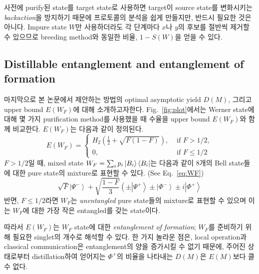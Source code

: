 \documentclass[
]{kaohandt}
\begin{document}
사전에 purify된 state를 target state로 사용하면 target이 source state를 변화시키는 \textit{backaction}을 방지하기 때문에 프로토콜의 분석을 쉽게 만들지만, 반드시 필요한 것은 아니다. 
Impure state $W$만 사용하더라도 각 단계마다 $x$나 $y$의 후보를 절반씩 제거할 수 있으므로 breeding method와 동일한 비율, $1 - S(W)$을 얻을 수 있다.

\subsection{Distillable entanglement and entanglement of formation}
마지막으로 본 논문에서 제안하는 방법의 optimal asymptotic yield $D(M)$, 그리고 upper bound $E(W_F)$에 대해 소개하고자한다.
Fig.~\ref{fig:plot}에서는 Werner state에 대해 몇 가지 purification method를 사용했을 때 수율을 upper bound $E(W_F)$와 함께 비교한다. $E(W_F)$는 다음과 같이 정의된다.
\begin{equation}
    E\left(W_F\right)= \begin{cases}H_2\left(\frac{1}{2}+\sqrt{F(1-F)}\right), & \text { if } F>1 / 2, \\ 0, & \text { if } F \leq 1 / 2\end{cases}
\end{equation}
$F > 1/2$일 때, mixed state $W_F = \sum_i p_i \ket{B_i}\bra{B_i}$는 다음과 같이 8개의 Bell state들에 대한 pure state의 mixture로 표현할 수 있다. (See Eq.~\eqref{eq:WF})
\begin{equation}
    \sqrt{F}\left|\Psi^{-}\right\rangle+\sqrt{\frac{1-F}{3}}\left( \pm\left|\Psi^{+}\right\rangle \pm\left|\Phi^{-}\right\rangle \pm i\left|\Phi^{+}\right\rangle\right.
\end{equation}
반면, $F \le 1/2$라면 $W_F$는 \textit{unentangled} pure state들의 mixture로 표현할 수 있으며 이는 $W_F$에 대한 가장 작은 entangled를 갖는 state이다. 

따라서 $E(W_F)$는 $W_F$ state에 대한 \textit{entanglement of formation}; $W_F$를 준비하기 위해 필요한 singlet의 개수로 해석할 수 있다. 
한 가지 놀라운 점은, local operation과 classical communication은 entanglement의 양을 증가시킬 수 없기 때문에, 주어진 상태로부터 distillation하여 얻어지는 $\Phi^+$의 비율을 나타내는 $D(M)$은 $E(M)$보다 클 수 없다.
\end{document}
